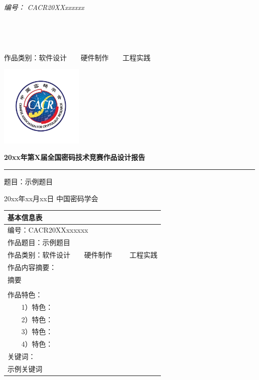 \documentclass[a4paper]{article}
\newcommand{\cmark}{\ding{51}}%
\newcommand{\done}{\rlap{$\square$}{\raisebox{2pt}{\large\hspace{1pt}\cmark}}\hspace{-2.5pt}}
\begin{document}
\thispagestyle{empty}
\noindent\parbox[c]{.6\linewidth}{
	\linespread{1.3}
	\itshape 编号： CACR20XXxxxxxx \par
    \  \par
    \  \par
    作品类别：\done 软件设计\ \ {\rlap{$\square$}{\large\hspace{1pt}}}\ \ 硬件制作\ \ {\rlap{$\square$}{\large\hspace{1pt}}}\ \ 工程实践 \par
}%
\parbox[c]{.45\linewidth}{
	\hfill\includegraphics[width=4cm]{imgs/logo.png}
}

\begin{center}

\par\vspace{.2\textheight}

{\Large\textbf{20xx年第X届全国密码技术竞赛作品设计报告}\par}
\Large
\rule{\textwidth}{0.5mm}
\par\vspace{.05\textheight}
\Large{题目：示例题目}

\medbreak
\par\vspace{.25\textheight}
\medbreak
20xx年xx月xx日
\medbreak
中国密码学会
\end{center}
\vfill
\begin{center}
        \begin{tabular}{ | p{.95\hsize} | }
    \hline
    基本信息表 \\
    \hline
    编号：CACR20XXxxxxxx \\
    \hline
    作品题目：示例题目\\
    \hline
    作品类别：\done 软件设计\ \ {\rlap{$\square$}{\large\hspace{1pt}}}\ \ 硬件制作\ \ \ {\rlap{$\square$}{\large\hspace{1pt}}}\ \ 工程实践 \\
    \hline
    作品内容摘要：\\
    \par 摘要
\\\\
作品特色：\\
\ \ \ \ 1）特色：\\
\ \ \ \ 2）特色：\\
\ \ \ \ 3）特色：\\
\ \ \ \ 4）特色：\\
\hline
关键词：\\
示例关键词
\\
\hline
\end{tabular}
\end{center}
\end{document}
